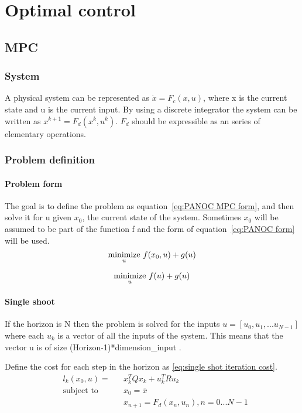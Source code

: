 \chapter{Optimal control}

\section{MPC}
	\subsection{System}
		A physical system can be represented as $\dot{x}=F_c(x,u)$, where x is the current state and u is the current input. By using a discrete integrator the system can be written as $x^{k+1}=F_d(x^{k},u^{k})$. $F_d$ should be expressible as an series of elementary operations.
	\subsection{Problem definition}
		\subsubsection{Problem form}
			The goal is to define the problem as equation~\ref{eq:PANOC MPC form}, and then solve it for u given $x_0$, the current state of the system. Sometimes $x_0$ will be assumed to be part of the function f and the form of equation~\ref{eq:PANOC form} will be used.
			\begin{equation}
				\underset{u}{\operatorname*{minimize}} \  f(x_0,u) + g(u)
				\label{eq:PANOC MPC form}
			\end{equation}
			
			\begin{equation}
				\underset{u}{\operatorname*{minimize}} \  f(u) + g(u)
				\label{eq:PANOC form}
			\end{equation}
		\subsubsection{Single shoot}
			If the horizon is N then the problem is solved for the inputs $u=[u_0,u_1,... u_{N-1}]$ where each $u_k$ is a vector of all the inputs of the system. This means that the vector u is of size (Horizon-1)*dimension\_input .
			
			Define the cost for each step in the horizon as \ref{eq:single shot iteration cost}.
			\begin{equation}
				\begin{aligned}
				& l_k(x_0,u) = &&  x_k^T Q x_k  +  u_k^T R u_k \\
				& \text{subject to}			&& x_0 = \bar{x} \\
				& 							&&  x_{n+1} = F_d(x_n,u_n), n=0...N-1
				\end{aligned}
				\label{eq:single shot iteration cost}
			\end{equation}
			
